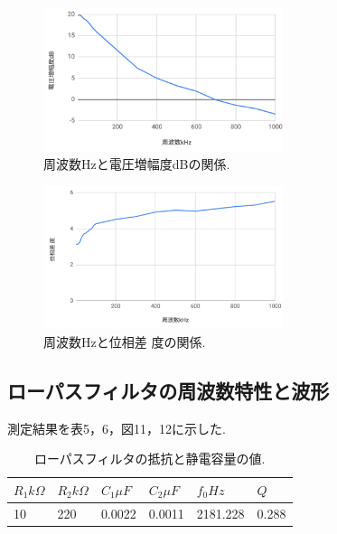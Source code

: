 \documentclass[twocolumn, 10pt,a4j]{jsarticle}
\begin{document}
          \begin{figure}[]
            \begin{center}
                \includegraphics[width=7cm]{../img/syuuhasuu_denatuzoufuku.png}
                \caption{周波数Hzと電圧増幅度dBの関係.}
            \end{center}
          \end{figure}

          \begin{figure}[]
            \begin{center}
                \includegraphics[width=7cm]{../img/syuuhasuu_isousa_do.png}
                \caption{周波数Hzと位相差 度の関係.}
            \end{center}
          \end{figure}



      \subsection{ローパスフィルタの周波数特性と波形}
           測定結果を表5，6，図11，12に示した.

           \begin{table}[H]
            \centering
            \footnotesize
            \caption{ローパスフィルタの抵抗と静電容量の値.}
            \label{opeanpu_risouteki_tokusei}
            \begin{tabular}{llllll} \hline
              $R_{1} k \Omega$ & $R_{2} k \Omega$& $C_{1} \mu F$& $C_{2} \mu F$& $f_{0} Hz$ & $Q$ \\ \hline
              10& 220& 0.0022& 0.0011& 2181.228& 0.288 \\ \hline
            \end{tabular}
          \end{table}
\end{document}
